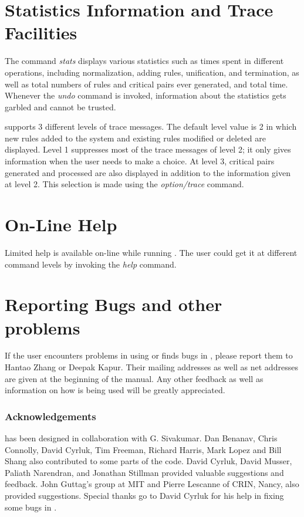 \section{Statistics Information and Trace Facilities}

The command {\em stats} displays various statistics such as times
spent in different operations, including normalization, adding rules,
unification, and termination, as well as total numbers of rules and
critical pairs ever generated, and total time. Whenever the {\em undo}
command is invoked, information about the statistics gets garbled and
cannot be trusted.
  
\RRL supports 3 different levels of trace messages. The default level
value is 2 in which new rules added to the system and existing rules
modified or deleted are displayed.  Level 1 suppresses most of the
trace messages of level 2; it only gives information when the user
needs to make a choice.  At level 3, critical pairs generated and
processed are also displayed in addition to the information given at
level 2. This selection is made using the {\em option/trace}
command.

\section{On-Line Help}
Limited help is available on-line while running \ERRL. The user could
get it at different command levels by invoking the {\em help} command.

\section{Reporting Bugs and other problems}
If the user encounters problems in using \RRL or finds bugs in \ERRL,
please report them to Hantao Zhang or Deepak Kapur. Their mailing
addresses as well as net addresses are given at the beginning of the
manual. Any other feedback as well as information on how 
\RRL is being used will be greatly appreciated.

\subsubsection{Acknowledgements}

\RRL has been designed in collaboration with G. Sivakumar.
Dan Benanav, Chris Connolly, David Cyrluk, Tim Freeman,
Richard Harris, Mark Lopez and Bill Shang also contributed to some
parts of the code. David Cyrluk, David Musser, Paliath Narendran, and
Jonathan Stillman provided valuable suggestions and feedback. John
Guttag's group at MIT and Pierre Lescanne of CRIN, Nancy, also
provided suggestions. Special thanks go to David Cyrluk for his help
in fixing some bugs in \ERRL.

